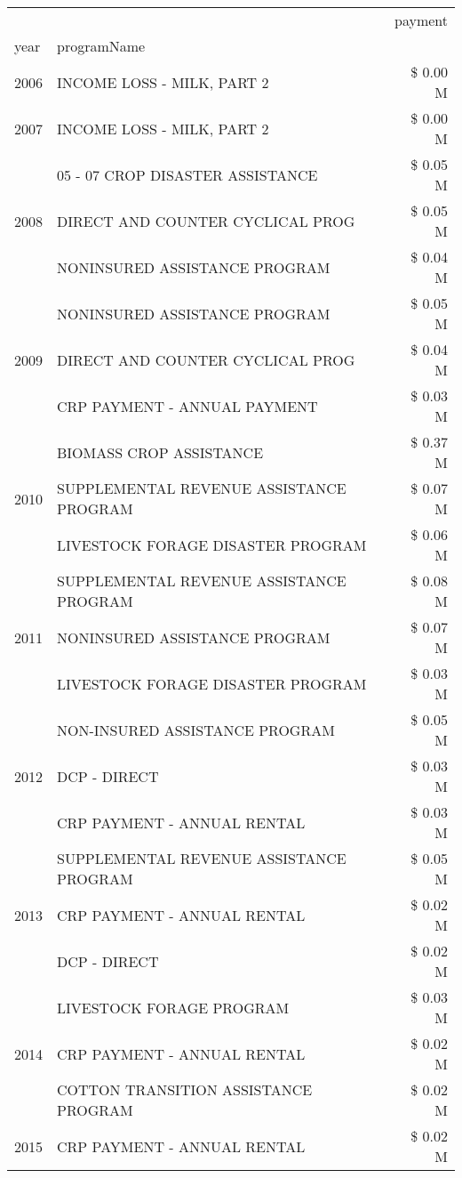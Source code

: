 \begin{tabular}{llr}
\toprule
 &  & payment \\
year & programName &  \\
\midrule
2006 & INCOME LOSS - MILK, PART 2 & \$ 0.00 M \\
\cline{1-3}
2007 & INCOME LOSS - MILK, PART 2 & \$ 0.00 M \\
\cline{1-3}
\multirow[t]{3}{*}{2008} & 05 - 07 CROP DISASTER ASSISTANCE & \$ 0.05 M \\
 & DIRECT AND COUNTER CYCLICAL PROG & \$ 0.05 M \\
 & NONINSURED ASSISTANCE PROGRAM & \$ 0.04 M \\
\cline{1-3}
\multirow[t]{3}{*}{2009} & NONINSURED ASSISTANCE PROGRAM & \$ 0.05 M \\
 & DIRECT AND COUNTER CYCLICAL PROG & \$ 0.04 M \\
 & CRP PAYMENT - ANNUAL PAYMENT & \$ 0.03 M \\
\cline{1-3}
\multirow[t]{3}{*}{2010} & BIOMASS CROP ASSISTANCE & \$ 0.37 M \\
 & SUPPLEMENTAL REVENUE ASSISTANCE PROGRAM & \$ 0.07 M \\
 & LIVESTOCK FORAGE DISASTER  PROGRAM & \$ 0.06 M \\
\cline{1-3}
\multirow[t]{3}{*}{2011} & SUPPLEMENTAL REVENUE ASSISTANCE PROGRAM & \$ 0.08 M \\
 & NONINSURED ASSISTANCE PROGRAM & \$ 0.07 M \\
 & LIVESTOCK FORAGE DISASTER PROGRAM & \$ 0.03 M \\
\cline{1-3}
\multirow[t]{3}{*}{2012} & NON-INSURED ASSISTANCE PROGRAM & \$ 0.05 M \\
 & DCP - DIRECT & \$ 0.03 M \\
 & CRP PAYMENT - ANNUAL RENTAL & \$ 0.03 M \\
\cline{1-3}
\multirow[t]{3}{*}{2013} & SUPPLEMENTAL REVENUE ASSISTANCE PROGRAM & \$ 0.05 M \\
 & CRP PAYMENT - ANNUAL RENTAL & \$ 0.02 M \\
 & DCP - DIRECT & \$ 0.02 M \\
\cline{1-3}
\multirow[t]{3}{*}{2014} & LIVESTOCK FORAGE PROGRAM & \$ 0.03 M \\
 & CRP PAYMENT - ANNUAL RENTAL & \$ 0.02 M \\
 & COTTON TRANSITION ASSISTANCE PROGRAM & \$ 0.02 M \\
\cline{1-3}
\multirow[t]{3}{*}{2015} & CRP PAYMENT - ANNUAL RENTAL & \$ 0.02 M \\

\end{tabular}

